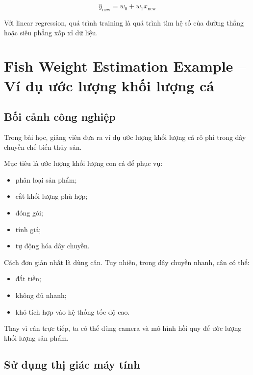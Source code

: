 \[
    \hat{y}_{\text{new}}
    =
    w_0+w_1x_{\text{new}}
\]

\begin{ghinho}
Với linear regression, quá trình training là quá trình tìm hệ số của đường thẳng hoặc siêu phẳng xấp xỉ dữ liệu.
\end{ghinho}

\section{Fish Weight Estimation Example -- Ví dụ ước lượng khối lượng cá}

\subsection{Bối cảnh công nghiệp}

Trong bài học, giảng viên đưa ra ví dụ ước lượng khối lượng cá rô phi trong dây chuyền chế biến thủy sản.

Mục tiêu là ước lượng khối lượng con cá để phục vụ:

\begin{itemize}
    \item phân loại sản phẩm;
    \item cắt khối lượng phù hợp;
    \item đóng gói;
    \item tính giá;
    \item tự động hóa dây chuyền.
\end{itemize}

Cách đơn giản nhất là dùng cân. Tuy nhiên, trong dây chuyền nhanh, cân có thể:

\begin{itemize}
    \item đắt tiền;
    \item không đủ nhanh;
    \item khó tích hợp vào hệ thống tốc độ cao.
\end{itemize}

\begin{ghinho}
Thay vì cân trực tiếp, ta có thể dùng camera và mô hình hồi quy để ước lượng khối lượng sản phẩm.
\end{ghinho}

\subsection{Sử dụng thị giác máy tính}

